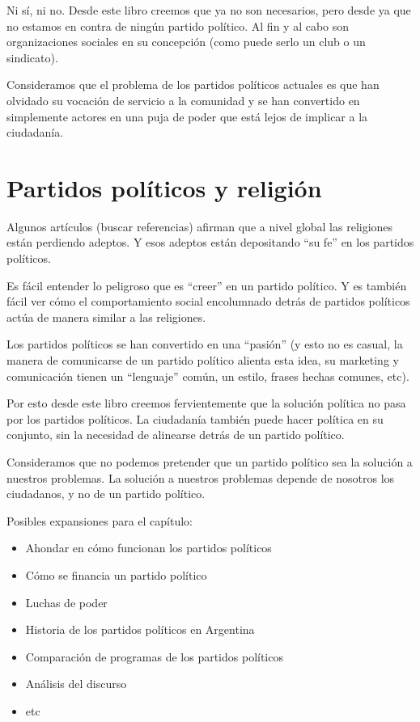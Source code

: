 \documentclass[
]{book}
\begin{document}
Ni sí, ni no. Desde este libro creemos que ya no son necesarios, pero desde ya que no estamos en contra de ningún partido político. Al fin y al cabo son organizaciones sociales en su concepción (como puede serlo un club o un sindicato).

Consideramos que el problema de los partidos políticos actuales es que han olvidado su vocación de servicio a la comunidad y se han convertido en simplemente actores en una puja de poder que está lejos de implicar a la ciudadanía.

\hypertarget{partidos-poluxedticos-y-religiuxf3n}{%
\section{Partidos políticos y religión}\label{partidos-poluxedticos-y-religiuxf3n}}

Algunos artículos (buscar referencias) afirman que a nivel global las religiones están perdiendo adeptos. Y esos adeptos están depositando ``su fe'' en los partidos políticos.

Es fácil entender lo peligroso que es ``creer'' en un partido político. Y es también fácil ver cómo el comportamiento social encolumnado detrás de partidos políticos actúa de manera similar a las religiones.

Los partidos políticos se han convertido en una ``pasión'' (y esto no es casual, la manera de comunicarse de un partido político alienta esta idea, su marketing y comunicación tienen un ``lenguaje'' común, un estilo, frases hechas comunes, etc).

Por esto desde este libro creemos fervientemente que la solución política no pasa por los partidos políticos. La ciudadanía también puede hacer política en su conjunto, sin la necesidad de alinearse detrás de un partido político.

Consideramos que no podemos pretender que un partido político sea la solución a nuestros problemas. La solución a nuestros problemas depende de nosotros los ciudadanos, y no de un partido político.

Posibles expansiones para el capítulo:

\begin{itemize}
\item
  Ahondar en cómo funcionan los partidos políticos
\item
  Cómo se financia un partido político
\item
  Luchas de poder
\item
  Historia de los partidos políticos en Argentina
\item
  Comparación de programas de los partidos políticos
\item
  Análisis del discurso
\item
  etc
\end{itemize}
\end{document}
